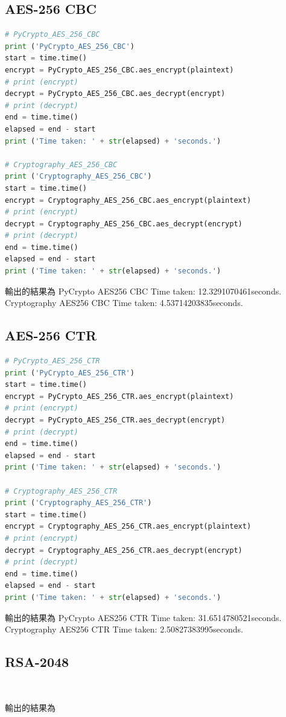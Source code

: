 \documentclass[12pt,a4paper]{article}
\begin{document}
\subsection{AES-256 CBC}
{
\begin{lstlisting}[language=Python]
# PyCrypto_AES_256_CBC
print ('PyCrypto_AES_256_CBC')
start = time.time()
encrypt = PyCrypto_AES_256_CBC.aes_encrypt(plaintext)
# print (encrypt)
decrypt = PyCrypto_AES_256_CBC.aes_decrypt(encrypt)
# print (decrypt)
end = time.time()
elapsed = end - start
print ('Time taken: ' + str(elapsed) + 'seconds.')

# Cryptography_AES_256_CBC
print ('Cryptography_AES_256_CBC')
start = time.time()
encrypt = Cryptography_AES_256_CBC.aes_encrypt(plaintext)
# print (encrypt)
decrypt = Cryptography_AES_256_CBC.aes_decrypt(encrypt)
# print (decrypt)
end = time.time()
elapsed = end - start
print ('Time taken: ' + str(elapsed) + 'seconds.')
\end{lstlisting}
輸出的結果為
\newline PyCrypto AES256 CBC
Time taken: 12.3291070461seconds.
\newline Cryptography AES256 CBC
Time taken: 4.53714203835seconds.
}

\subsection{AES-256 CTR}
{
\begin{lstlisting}[language=Python]
# PyCrypto_AES_256_CTR
print ('PyCrypto_AES_256_CTR')
start = time.time()
encrypt = PyCrypto_AES_256_CTR.aes_encrypt(plaintext)
# print (encrypt)
decrypt = PyCrypto_AES_256_CTR.aes_decrypt(encrypt)
# print (decrypt)
end = time.time()
elapsed = end - start
print ('Time taken: ' + str(elapsed) + 'seconds.')

# Cryptography_AES_256_CTR
print ('Cryptography_AES_256_CTR')
start = time.time()
encrypt = Cryptography_AES_256_CTR.aes_encrypt(plaintext)
# print (encrypt)
decrypt = Cryptography_AES_256_CTR.aes_decrypt(encrypt)
# print (decrypt)
end = time.time()
elapsed = end - start
print ('Time taken: ' + str(elapsed) + 'seconds.')
\end{lstlisting}
輸出的結果為
\newline PyCrypto AES256 CTR
Time taken: 31.6514780521seconds.
\newline Cryptography AES256 CTR
Time taken: 2.50827383995seconds.
}

\subsection{RSA-2048}
{
\begin{lstlisting}[language=Python]
	
\end{lstlisting}
輸出的結果為
}
\end{document}
